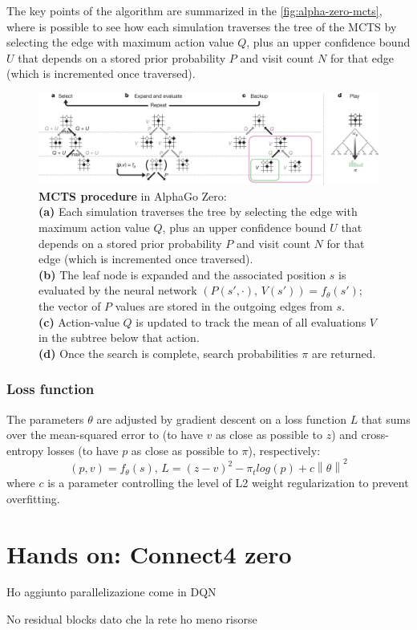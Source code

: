 \documentclass{article}
\newcommand{\norm}[1]{\left\lVert#1\right\rVert}
\begin{document}
The key points of the algorithm are summarized in the \autoref{fig:alpha-zero-mcts}, where is possible to see how each simulation traverses the tree of the MCTS by selecting the edge with maximum action value $Q$, plus an upper confidence bound $U$ that depends on a stored prior probability $P$ and visit count $N$ for that edge (which is incremented once traversed).
\begin{figure}[H]
	\centerline{\includegraphics[width=15cm]{alpha-zero-mcts.png}}
	\caption{\textbf{MCTS procedure} in AlphaGo Zero\cite{Silver_2016}:\\ \textbf{(a)} Each simulation traverses the tree by selecting the edge with maximum action value $Q$, plus an upper confidence bound $U$ that depends on a stored prior probability $P$ and visit count $N$ for that edge (which is incremented once traversed).\\ \textbf{(b)} The leaf node is expanded and the associated position $s$ is evaluated by the neural network $(P(s', \cdot), \, V(s')) = f_\theta(s')$; the vector of $P$ values are stored in the outgoing edges from $s$.\\ \textbf{(c)} Action-value $Q$ is updated to track the mean of all evaluations $V$ in the subtree below that action.\\ \textbf{(d)} Once the search is complete, search probabilities $\pi$ are returned.}
	\label{fig:alpha-zero-mcts}
\end{figure}

\subsubsection{Loss function}
The parameters $\theta$ are adjusted by gradient descent on a loss function $L$ that sums over the mean-squared error to (to have $v$ as close as possible to $z$) and cross-entropy losses (to have $p$ as close as possible to $\pi$), respectively:
\begin{equation}\label{eq:loss_function_alphazero}
	(p,v) = f_\theta(s),\, L = (z-v)^2 - \pi_t log(p) + c \norm{\theta}^2
\end{equation}
where $c$ is a parameter controlling the level of L2 weight regularization to prevent overfitting.

\section{Hands on: Connect4 zero}
Ho aggiunto parallelizazione come in DQN

No residual blocks dato che la rete ho meno risorse


\end{document}
